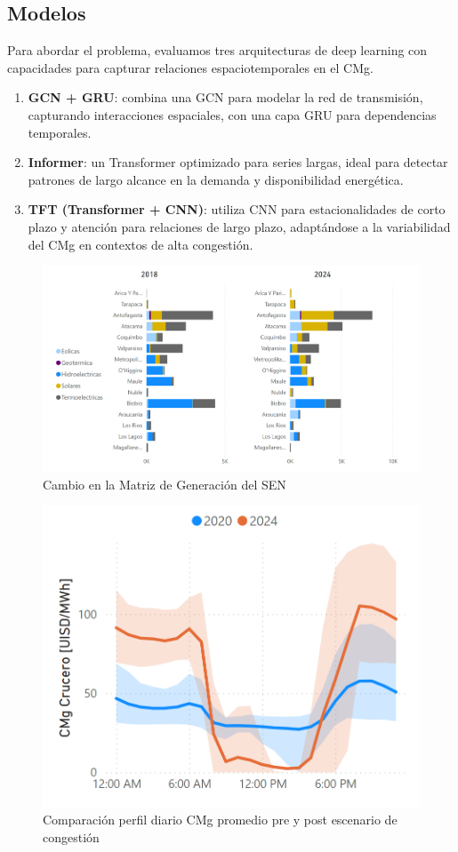 \documentclass[twocolumn]{article}
\begin{document}
\subsection{Modelos}
Para abordar el problema, evaluamos tres arquitecturas de deep learning con capacidades para capturar relaciones espaciotemporales en el CMg.
\begin{enumerate}
    \item \textbf{GCN + GRU}: combina una GCN para modelar la red de transmisión, capturando interacciones espaciales, con una capa GRU para dependencias temporales.
    \item \textbf{Informer}: un Transformer optimizado para series largas, ideal para detectar patrones de largo alcance en la demanda y disponibilidad energética.
    \item \textbf{TFT (Transformer + CNN)}: utiliza CNN para estacionalidades de corto plazo y atención para relaciones de largo plazo, adaptándose a la variabilidad del CMg en contextos de alta congestión.
\end{enumerate}

\begin{figure}[htbp]
    \centering
    \includegraphics[width=0.8\columnwidth]{imgs/matriz_sist.png}
    \caption{Cambio en la Matriz de Generación del SEN}
    \label{fig:matriz_sistema}
\end{figure}

\begin{figure}[htbp]
    \centering
    \includegraphics[width=0.8\columnwidth]{imgs/cmg_comparacion.png}
    \caption{Comparación perfil diario CMg promedio pre y post escenario de congestión}
    \label{fig:comp_cmg}
\end{figure}
\end{document}
